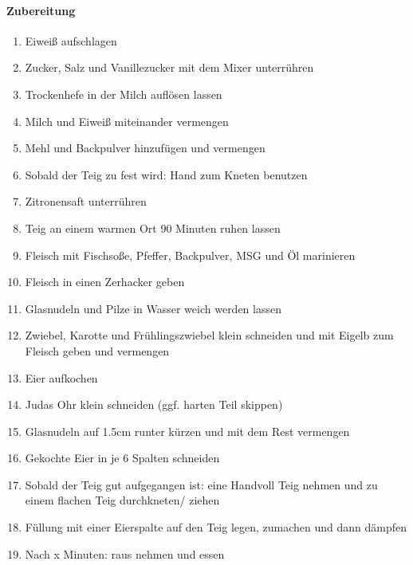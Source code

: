 \paragraph{Zubereitung}
\begin{enumerate}[noitemsep]
	\item Eiweiß aufschlagen
	\item Zucker, Salz und Vanillezucker mit dem Mixer unterrühren
	\item Trockenhefe in der Milch auflösen lassen 
	\item Milch und Eiweiß miteinander vermengen
	\item Mehl und Backpulver hinzufügen und vermengen
	\item Sobald der Teig zu fest wird: Hand zum Kneten benutzen
	\item Zitronensaft unterrühren
	\item Teig an einem warmen Ort 90 Minuten ruhen lassen
	\item Fleisch mit Fischsoße, Pfeffer, Backpulver, MSG und Öl marinieren
	\item Fleisch in einen Zerhacker geben
	\item Glasnudeln und Pilze in Wasser weich werden lassen
	\item Zwiebel, Karotte und Frühlingszwiebel klein schneiden und mit Eigelb zum Fleisch geben und vermengen
	\item Eier aufkochen
	\item Judas Ohr klein schneiden (ggf. harten Teil skippen)
	\item Glasnudeln auf 1.5cm runter kürzen und mit dem Rest vermengen
	\item Gekochte Eier in je 6 Spalten schneiden
	\item Sobald der Teig gut aufgegangen ist: eine Handvoll Teig nehmen und zu einem flachen Teig durchkneten/ ziehen
	\item Füllung mit einer Eierspalte auf den Teig legen, zumachen und dann dämpfen
	\item Nach x Minuten: raus nehmen und essen
\end{enumerate}